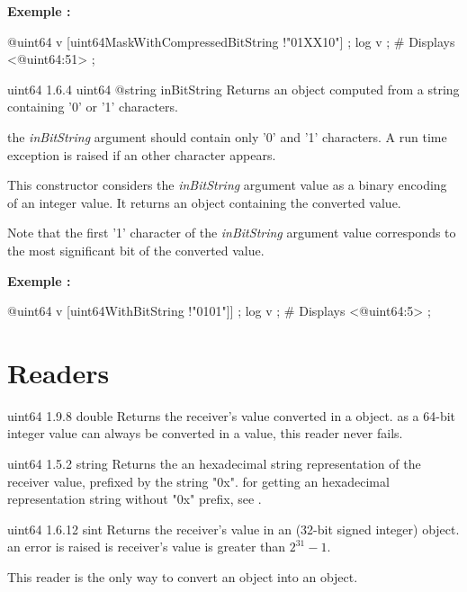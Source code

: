 \textbf{Exemple :}
\begin{galgascode}
@uint64 v [uint64MaskWithCompressedBitString !"01XX10"] ;
log v ; \# Displays <@uint64:51> ;
\end{galgascode}



{uint64}
{1.6.4}
{uint64}
{@string inBitString}
{Returns an  object computed from a string containing '0' or '1' characters.}
{the \emph{inBitString} argument should contain only '0' and '1' characters. A run time exception is raised if an other character appears.

This constructor considers the \emph{inBitString} argument value as a binary encoding of an integer value. It returns an  object containing the converted value.

Note that the first '1' character of the \emph{inBitString} argument value corresponds to the most significant bit of the converted value.}

\textbf{Exemple :}
\begin{galgascode}
@uint64 v [uint64WithBitString !"0101"]] ;
log v ; # Displays <@uint64:5> ;
\end{galgascode}


\section{Readers}

{uint64}
{1.9.8}
{double}
{Returns the receiver's value converted in a  object.}
{as a 64-bit integer value can always be converted in a  value, this reader never fails.}



{uint64}
{1.5.2}
{string}
{Returns the an hexadecimal string representation of the receiver value, prefixed by the string "0x".}
{for getting an hexadecimal representation string without "0x" prefix, see .}





{uint64}
{1.6.12}
{sint}
{Returns the receiver's value in an  (32-bit signed integer) object.}
{an error is raised is receiver's value is greater than $2^{31}-1$.}

This reader is the only way to convert an  object into an  object.





